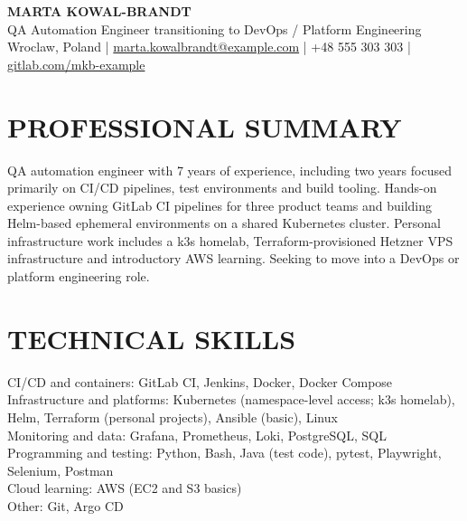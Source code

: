 \documentclass[11pt,a4paper]{article}
\begin{document}
\begin{center}
{\LARGE\bfseries\color{primarycolor} MARTA KOWAL-BRANDT}\\
QA Automation Engineer transitioning to DevOps / Platform Engineering\\
Wroclaw, Poland | \href{mailto:marta.kowalbrandt@example.com}{marta.kowalbrandt@example.com} | +48 555 303 303 | \url{gitlab.com/mkb-example}
\end{center}

\section*{PROFESSIONAL SUMMARY}
QA automation engineer with 7 years of experience, including two years focused primarily on CI/CD pipelines, test environments and build tooling. Hands-on experience owning GitLab CI pipelines for three product teams and building Helm-based ephemeral environments on a shared Kubernetes cluster. Personal infrastructure work includes a k3s homelab, Terraform-provisioned Hetzner VPS infrastructure and introductory AWS learning. Seeking to move into a DevOps or platform engineering role.

\section*{TECHNICAL SKILLS}
CI/CD and containers: GitLab CI, Jenkins, Docker, Docker Compose\\
Infrastructure and platforms: Kubernetes (namespace-level access; k3s homelab), Helm, Terraform (personal projects), Ansible (basic), Linux\\
Monitoring and data: Grafana, Prometheus, Loki, PostgreSQL, SQL\\
Programming and testing: Python, Bash, Java (test code), pytest, Playwright, Selenium, Postman\\
Cloud learning: AWS (EC2 and S3 basics)\\
Other: Git, Argo CD
\end{document}
